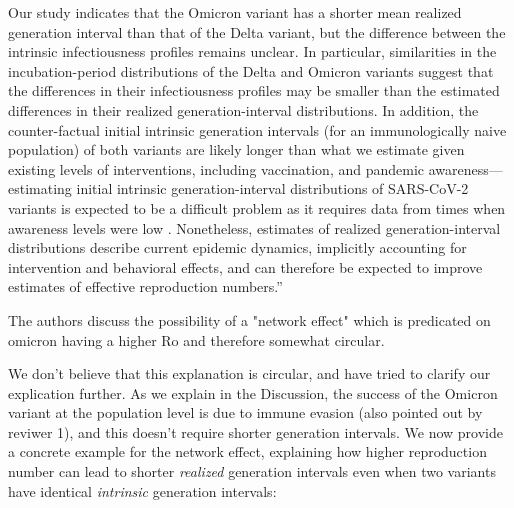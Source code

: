 \documentclass[12pt]{article}
\newcommand{\revtext}{\textsf}
\begin{document}
Our study indicates that the Omicron variant has a shorter mean realized generation interval than that of the Delta variant, but the difference between the intrinsic infectiousness profiles remains unclear.
In particular, similarities in the incubation-period distributions of the Delta and Omicron variants suggest that the differences in their infectiousness profiles may be smaller than the estimated differences in their realized generation-interval distributions.
In addition, the counter-factual initial intrinsic generation intervals (for an immunologically naive population) of both variants are likely longer than what we estimate given existing levels of interventions, including vaccination, and pandemic awareness---estimating initial intrinsic generation-interval distributions of SARS-CoV-2 variants is expected to be a difficult problem as it requires data from times when awareness levels were low \citep{sender2021unmitigated}.
Nonetheless, estimates of realized generation-interval distributions describe current epidemic dynamics, implicitly accounting for intervention and behavioral effects,
and can therefore be expected to improve estimates of effective reproduction numbers.''

\revtext{The authors discuss the possibility of a "network effect" which is predicated on omicron having a higher Ro and therefore somewhat circular.}

We don't believe that this explanation is circular, and have tried to clarify our explication further. As we explain in the Discussion, the success of the Omicron variant at the population level is due to immune evasion (also pointed out by reviwer 1), and this doesn't require shorter generation intervals. We now provide a concrete example for the network effect, explaining how higher reproduction number can lead to shorter \emph{realized} generation intervals even when two variants have identical \emph{intrinsic} generation intervals:
\end{document}
